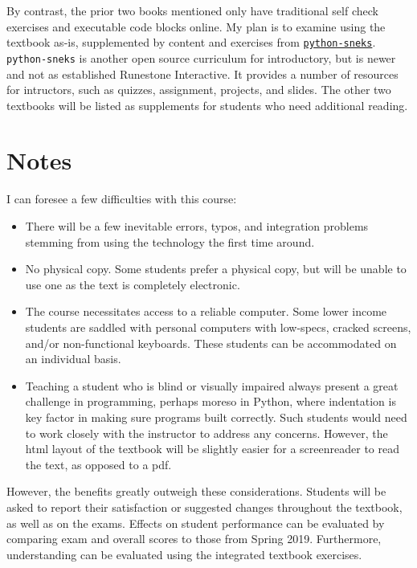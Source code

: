 \documentclass[]{article}
\begin{document}
By contrast, the prior two books mentioned only have traditional self check exercises and executable code blocks online.
My plan is to examine using the textbook as-is, supplemented by content and exercises from \href{https://github.com/acbart/python-sneks}{\texttt{python-sneks}}.
\texttt{python-sneks} is another open source curriculum for introductory, but is newer and not as established Runestone Interactive.
It provides a number of resources for intructors, such as quizzes, assignment, projects, and slides.
The other two textbooks will be listed as supplements for students who need additional reading.


\section{Notes}

I can foresee a few difficulties with this course:
\begin{itemize}
	\item There will be a few inevitable errors, typos, and integration problems stemming from using the technology the first time around.
	\item No physical copy.  Some students prefer a physical copy, but will be unable to use one as the text is completely electronic.
	\item The course necessitates access to a reliable computer.  Some lower income students are saddled with personal computers with low-specs, cracked screens, and/or non-functional keyboards.  These students can be accommodated on an individual basis.
	\item Teaching a student who is blind or visually impaired always present a great challenge in programming, perhaps moreso in Python, where indentation is key factor in making sure programs built correctly.
	Such students would need to work closely with the instructor to address any concerns.
	However, the html layout of the textbook will be slightly easier for a screenreader to read the text, as opposed to a pdf.
\end{itemize}


However, the benefits greatly outweigh these considerations.
Students will be asked to report their satisfaction or suggested changes throughout the textbook, as well as on the exams.
Effects on student performance can  be evaluated by comparing exam and overall scores to those from Spring 2019.
Furthermore, understanding can be evaluated using the integrated textbook exercises.
\end{document}
